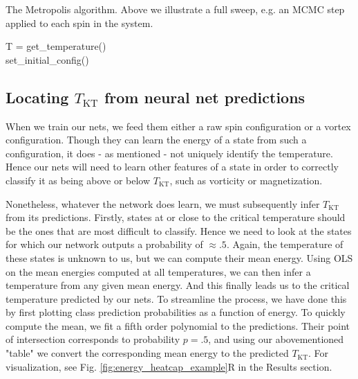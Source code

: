\documentclass[]{article}
\begin{document}
\begin{algorithm}
	\caption{The Metropolis algorithm. Above we illustrate a full sweep, e.g. an MCMC step applied to each spin in the system.}
	
	T = get\_temperature()\\
	set\_initial\_config()\\

\end{algorithm} 
\vspace{5px}

\subsection{Locating $T_\text{KT}$ from neural net predictions}
When we train our nets, we feed them either a raw spin configuration or a vortex configuration. Though they can learn the energy of a state from such a configuration, it does - as mentioned - not uniquely identify the temperature. Hence our nets will need to learn other features of a state in order to correctly classify it as being above or below $T_\text{KT}$, such as vorticity or magnetization. 

Nonetheless, whatever the network does learn, we must subsequently infer $T_\text{KT}$ from its predictions. Firstly, states at or close to the critical temperature should be the ones that are most difficult to classify. Hence we need to look at the states for which our network outputs a probability of $\approx .5$. Again, the temperature of these states is unknown to us, but we can compute their mean energy. Using OLS on the mean energies computed at all temperatures, we can then infer a temperature from any given mean energy. And this finally leads us to the critical temperature predicted by our nets. To streamline the process, we have done this by first plotting class prediction probabilities as a function of energy. To quickly compute the mean, we fit a fifth order polynomial to the predictions. Their point of intersection corresponds to probability $p = .5$, and using our abovementioned "table" we convert the corresponding mean energy to the predicted $T_\text{KT}$. For visualization, see Fig. \ref{fig:energy_heatcap_example}R in the Results section.
\end{document}
